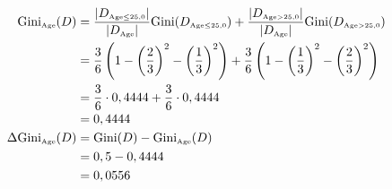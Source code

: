 \documentclass[
english,
smallborders
]{i6prcsht}
\newcommand{\OfSpecificValue}[3]{_{\text{\tiny #1#2#3}}}
\newcommand{\OfAttribute}[1]{_{\text{\tiny #1}}}
\begin{document}
\begin{solution}
\begin{enumerate}
\begin{enumerate}
\begin{enumerate}
\begin{enumerate}
					                        \begin{alignat*}{2}
						                        \text{Gini}\OfAttribute{Age}(D)       & = \frac{|D\OfSpecificValue{Age}{$\leq$}{25,0}|}{|D\OfAttribute{Age}|} \text{Gini}(D\OfSpecificValue{Age}{$\leq$}{25,0}) + \frac{|D\OfSpecificValue{Age}{$>$}{25,0}|}{|D\OfAttribute{Age}|} \text{Gini}(D\OfSpecificValue{Age}{$>$}{25,0}) \\
						                                                              & = \frac{3}{6} \left(1 - \left(\frac{2}{3}\right)^2 - \left(\frac{1}{3}\right)^2\right) + \frac{3}{6} \left(1 - \left(\frac{1}{3}\right)^2 - \left(\frac{2}{3}\right)^2\right)                                                             \\
						                                                              & = \frac{3}{6} \cdot 0,4444 + \frac{3}{6} \cdot 0,4444                                                                                                                                                                                     \\
						                                                              & = 0,4444                                                                                                                                                                                                                                  \\
						                        \Delta\text{Gini}\OfAttribute{Age}(D) & = \text{Gini}(D) - \text{Gini}\OfAttribute{Age}(D)                                                                                                                                                                                        \\
						                                                              & = 0,5 - 0,4444                                                                                                                                                                                                                            \\
						                                                              & = 0,0556                                                                                                                                                                                                                                  \\
					                        \end{alignat*}
				                  \end{enumerate}
				                  

\end{enumerate}
\end{enumerate}
\end{enumerate}
\end{solution}
\end{document}
